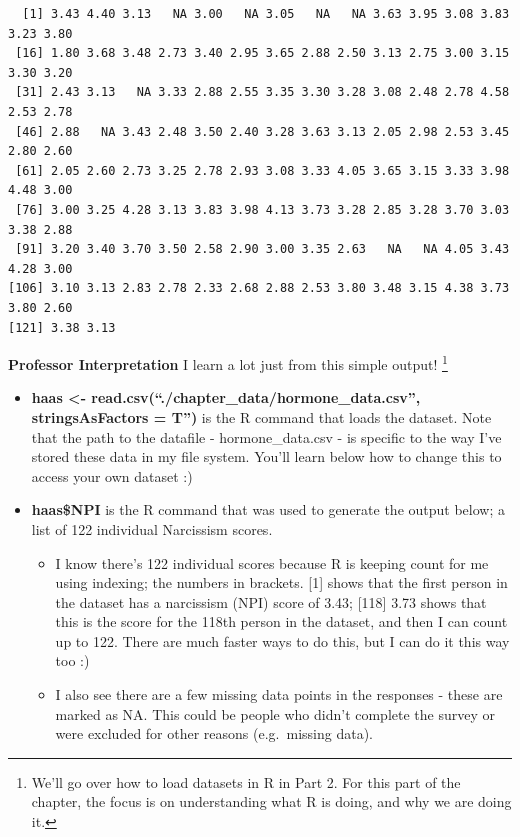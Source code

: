 \documentclass[
  letterpaper,
  DIV=11,
  numbers=noendperiod,
  oneside]{scrreprt}
\providecommand{\tightlist}{%
  \setlength{\itemsep}{0pt}\setlength{\parskip}{0pt}}\usepackage{longtable,booktabs,array}
\begin{document}
\begin{verbatim}
  [1] 3.43 4.40 3.13   NA 3.00   NA 3.05   NA   NA 3.63 3.95 3.08 3.83 3.23 3.80
 [16] 1.80 3.68 3.48 2.73 3.40 2.95 3.65 2.88 2.50 3.13 2.75 3.00 3.15 3.30 3.20
 [31] 2.43 3.13   NA 3.33 2.88 2.55 3.35 3.30 3.28 3.08 2.48 2.78 4.58 2.53 2.78
 [46] 2.88   NA 3.43 2.48 3.50 2.40 3.28 3.63 3.13 2.05 2.98 2.53 3.45 2.80 2.60
 [61] 2.05 2.60 2.73 3.25 2.78 2.93 3.08 3.33 4.05 3.65 3.15 3.33 3.98 4.48 3.00
 [76] 3.00 3.25 4.28 3.13 3.83 3.98 4.13 3.73 3.28 2.85 3.28 3.70 3.03 3.38 2.88
 [91] 3.20 3.40 3.70 3.50 2.58 2.90 3.00 3.35 2.63   NA   NA 4.05 3.43 4.28 3.00
[106] 3.10 3.13 2.83 2.78 2.33 2.68 2.88 2.53 3.80 3.48 3.15 4.38 3.73 3.80 2.60
[121] 3.38 3.13
\end{verbatim}

\textbf{Professor Interpretation} I learn a lot just from this simple
output! \footnote{We'll go over how to load datasets in R in Part 2. For
  this part of the chapter, the focus is on understanding what R is
  doing, and why we are doing it.}

\begin{itemize}
\tightlist
\item
  \textbf{haas \textless-
  read.csv(``./chapter\_data/hormone\_data.csv'', stringsAsFactors =
  T'')} is the R command that loads the dataset. Note that the path to
  the datafile - hormone\_data.csv - is specific to the way I've stored
  these data in my file system. You'll learn below how to change this to
  access your own dataset :)
\item
  \textbf{haas\$NPI} is the R command that was used to generate the
  output below; a list of 122 individual Narcissism scores.

  \begin{itemize}
  \tightlist
  \item
    I know there's 122 individual scores because R is keeping count for
    me using indexing; the numbers in brackets. {[}1{]} shows that the
    first person in the dataset has a narcissism (NPI) score of 3.43;
    {[}118{]} 3.73 shows that this is the score for the 118th person in
    the dataset, and then I can count up to 122. There are much faster
    ways to do this, but I can do it this way too :)
  \item
    I also see there are a few missing data points in the responses -
    these are marked as NA. This could be people who didn't complete the
    survey or were excluded for other reasons (e.g.~missing data).
  \end{itemize}
\end{itemize}
\end{document}
